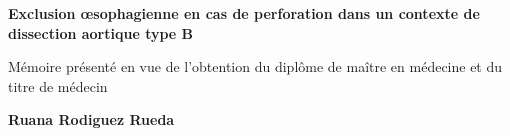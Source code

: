 \documentclass[./tfe.tex]{subfiles}
\begin{document}
\begin{titlepage}

    \begin{center}
    
        \vspace*{4cm}

        \textbf{\huge Exclusion œsophagienne en cas de perforation dans un contexte de dissection aortique type B}

        \vspace*{2cm}
        
        \large Mémoire présenté en vue de l'obtention du diplôme de maître en médecine et du titre de médecin

        \vspace{3cm}
        
        \textbf{Ruana Rodiguez Rueda}
        
        \vspace{1cm}
        

        \vspace{2cm}
    \end{center}

\end{titlepage}
\end{document}
